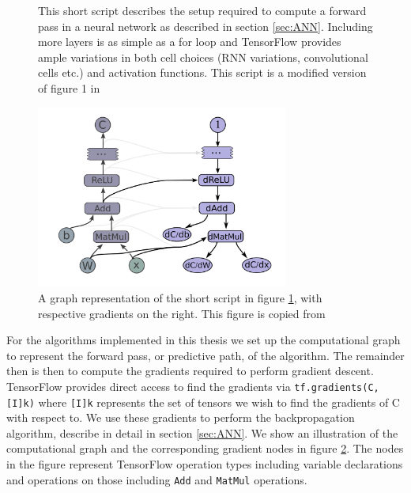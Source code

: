 \begin{figure}
\centering
\begin{minipage}[c]{\linewidth}

\end{minipage}
\caption[A forward pass in TensorFlow]{This short script describes the setup required to compute a forward pass in a neural network as described in section \ref{sec:ANN}. Including more layers is as simple as a for loop and TensorFlow provides ample variations in both cell choices (RNN variations, convolutional cells etc.) and activation functions. This script is a modified version of figure 1 in \cite{tensorflow}}\label{fig:graph}
\end{figure}

\begin{figure}
\centering
\includegraphics[height=6cm]{../snippets/gradients_graph.png}
\caption[Graph representation of the forward pass and gradients of a simple dense neural network]{A graph representation of the short script in figure \ref{fig:graph}, with respective gradients on the right. This figure is copied from \citet{tensorflow}}\label{fig:grad_graph}
\end{figure}

For the algorithms implemented in this thesis we set up the computational graph to represent the forward pass, or predictive path, of the algorithm. The remainder then is then to compute the gradients required to perform gradient descent. TensorFlow provides direct access to find the gradients via \lstinline{tf.gradients(C, [I]k)} where \lstinline{[I]k} represents the set of tensors we wish to find the gradients of C with respect to. We use these gradients to perform the backpropagation algorithm, describe in detail in section \ref{sec:ANN}. We show an illustration of the computational graph and the corresponding gradient nodes in figure \ref{fig:grad_graph}. The nodes in the figure represent TensorFlow operation types including variable declarations and operations on those including \lstinline{Add} and \lstinline{MatMul} operations.

